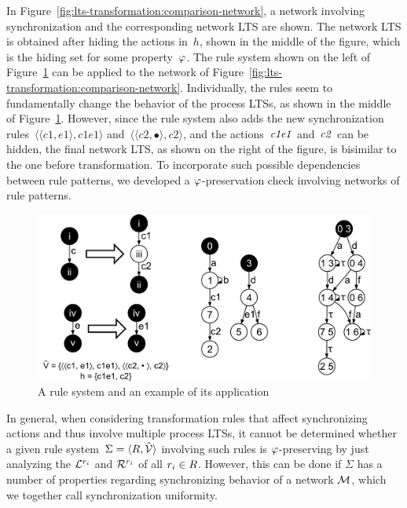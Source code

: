 In Figure~\ref{fig:lts-transformation:comparison-network}, a network involving synchronization and the corresponding network LTS are shown.
The network LTS is obtained after hiding the actions in~$h$, shown in the middle of the figure, which is the hiding set for some property~$\varphi$.
The rule system shown on the left of Figure~\ref{fig:lts-transformation:preserving-rules} can be applied to the network of Figure~\ref{fig:lts-transformation:comparison-network}.
Individually, the rules seem to fundamentally change the behavior of the process LTSs, as shown in the middle of Figure~\ref{fig:lts-transformation:preserving-rules}.
However, since the rule system also adds the new synchronization rules~$\langle\langle c1, e1 \rangle, c1e1\rangle$ and~$\langle\langle c2, \bullet \rangle, c2\rangle$, and the actions~$\it{c1e1}$ and~$\it{c2}$ can be hidden,
the final network LTS, as shown on the right of the figure, is bisimilar to the one before transformation.
To incorporate such possible dependencies between rule patterns, we developed a $\varphi$-preservation check involving networks of rule patterns.

\begin{figure}[hbt]
\centering
\includegraphics[scale=0.2]{lts-transformation/figs/preserving-rules}
\caption{A rule system and an example of its application}
\label{fig:lts-transformation:preserving-rules}
\end{figure}

In general, when considering transformation rules that affect synchronizing actions and thus involve multiple process LTSs, it cannot be determined whether a given rule system~$\Sigma = \langle R,\hat{{\mathcal{V}}} \rangle$ involving such rules is $\varphi$-preserving by just analyzing the $\mathcal{L}^{{r_i}}$ and $\mathcal{R}^{{r_i}}$ of all ${r_i} \in R$.
However, this can be done if $\Sigma$ has a number of properties regarding synchronizing behavior of a network $\mathcal{M}$, which we together call synchronization uniformity.

